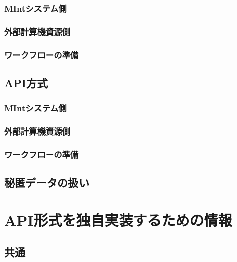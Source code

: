 \documentclass[letterpaper,10pt,dvipdfmx,openany]{sphinxmanual}
\begin{document}
\subsection{MIntシステム側}
\label{\detokenize{using_distributed_properties:id28}}

\subsection{外部計算機資源側}
\label{\detokenize{using_distributed_properties:id29}}

\subsection{ワークフローの準備}
\label{\detokenize{using_distributed_properties:id30}}

\section{API方式}
\label{\detokenize{using_distributed_properties:id31}}

\subsection{MIntシステム側}
\label{\detokenize{using_distributed_properties:id32}}

\subsection{外部計算機資源側}
\label{\detokenize{using_distributed_properties:id33}}

\subsection{ワークフローの準備}
\label{\detokenize{using_distributed_properties:id34}}

\section{秘匿データの扱い}
\label{\detokenize{using_distributed_properties:id35}}

\chapter{API形式を独自実装するための情報}
\label{\detokenize{using_distributed_properties:id36}}

\section{共通}
\label{\detokenize{using_distributed_properties:id37}}
\end{document}
